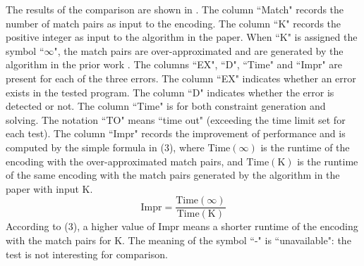 The results of the comparison are shown in .  
The column ``Match" records the number of match pairs as input to the encoding. The column ``K" records the positive integer as input to the algorithm in the paper. When ``K" is assigned the symbol ``$\infty$", the match pairs are over-approximated and are generated by the algorithm in the prior work \cite{}. The columns ``EX", ``D", ``Time" and ``Impr" are present for each of the three errors. The column ``EX" indicates whether an error exists in the tested program. The column ``D" indicates whether the error is detected or not. The column ``Time" is for both constraint generation and solving. The notation ``TO" means ``time out" (exceeding the time limit set for each test). The column ``Impr" records the improvement of performance and is computed by the simple formula in (3), where $\mathrm{Time}(\infty)$ is the runtime of the encoding with the over-approximated match pairs, and $\mathrm{Time}(\mathrm{K})$ is the runtime of the same encoding with the match pairs generated by the algorithm in the paper with input K. 
\begin{equation}
\mathrm{Impr} = \frac{\mathrm{Time}(\infty)}{\mathrm{Time}(\mathrm{K})}
\end{equation}
According to (3), a higher value of $\mathrm{Impr}$ means a shorter runtime of the encoding with the match pairs for K.
The meaning of the symbol ``-" is ``unavailable": the test is not interesting for comparison.

